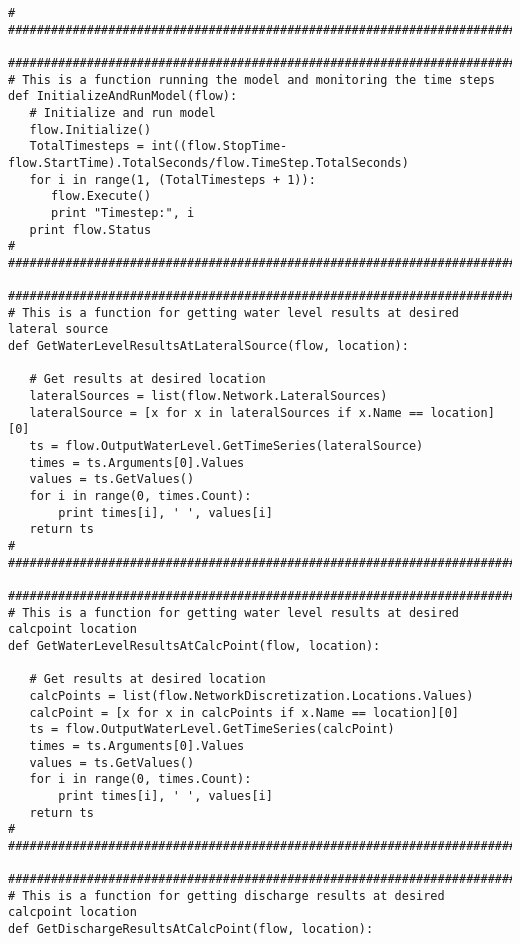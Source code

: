 {\begin{verbatim}
#
###################################################################################################

###################################################################################################
# This is a function running the model and monitoring the time steps
def InitializeAndRunModel(flow): 
   # Initialize and run model
   flow.Initialize()
   TotalTimesteps = int((flow.StopTime-flow.StartTime).TotalSeconds/flow.TimeStep.TotalSeconds)
   for i in range(1, (TotalTimesteps + 1)):
      flow.Execute()
      print "Timestep:", i
   print flow.Status
#
###################################################################################################
  
###################################################################################################
# This is a function for getting water level results at desired lateral source
def GetWaterLevelResultsAtLateralSource(flow, location):
   
   # Get results at desired location
   lateralSources = list(flow.Network.LateralSources)
   lateralSource = [x for x in lateralSources if x.Name == location][0]
   ts = flow.OutputWaterLevel.GetTimeSeries(lateralSource)
   times = ts.Arguments[0].Values
   values = ts.GetValues()
   for i in range(0, times.Count):
       print times[i], ' ', values[i]
   return ts
#
###################################################################################################

###################################################################################################
# This is a function for getting water level results at desired calcpoint location
def GetWaterLevelResultsAtCalcPoint(flow, location):
   
   # Get results at desired location
   calcPoints = list(flow.NetworkDiscretization.Locations.Values)
   calcPoint = [x for x in calcPoints if x.Name == location][0]
   ts = flow.OutputWaterLevel.GetTimeSeries(calcPoint)
   times = ts.Arguments[0].Values
   values = ts.GetValues()
   for i in range(0, times.Count):
       print times[i], ' ', values[i]
   return ts
#
###################################################################################################

###################################################################################################
# This is a function for getting discharge results at desired calcpoint location
def GetDischargeResultsAtCalcPoint(flow, location):
   

\end{verbatim}}
